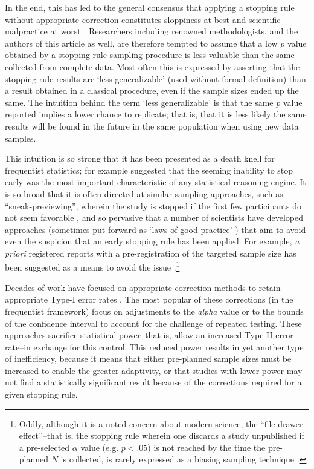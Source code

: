 \documentclass[man]{apa7}
\theoremstyle{definition}
\begin{document}
In the end, this has led to the general consensus that applying a stopping rule without appropriate correction constitutes sloppiness at best and scientific malpractice at worst \parencite{fanelli2009many}.  Researchers including renowned methodologists, and the authors of this article as well, are therefore tempted to assume that a low $p$ value obtained by a stopping rule sampling procedure is less valuable than the same collected from complete data.  Most often this is expressed by asserting that the stopping-rule %
results are `less generalizable' (used without formal definition) than a result obtained in a classical procedure, even if the sample sizes ended up the same.  The intuition behind the term `less generalizable' is that the same $p$ value reported implies a lower chance to replicate; that is, that it is less likely the same results will be found in the future in the same population when using new data samples. 

This intuition is so strong that it has been presented as a death knell for frequentist statistics; for example \textcite{Venderkerchove_2014} suggested that the seeming inability to stop early was the most important characteristic of any statistical reasoning engine.  It is so broad that it is often directed at similar sampling approaches, such as ``sneak-previewing'', wherein the study is stopped if the first few participants do not seem favorable \parencite[see, e.g.][]{armitage1969repeated}, and so pervasive that a number of scientists have developed approaches (sometimes put forward as `laws of good practice' \parencite{simmons2011false}) that aim to avoid even the suspicion that an early stopping rule has been applied. For example, \textit{a priori} registered reports with a pre-registration of the targeted sample size has been suggested as a means to avoid the issue \parencite{nosek2014registered}.\footnote{Oddly, although it is a noted concern about modern science, the ``file-drawer effect''--that is, the stopping rule wherein one discards a study unpublished if a pre-selected $\alpha$ value (e.g. $p < .05$) is not reached by the time the pre-planned $N$ is collected, is rarely expressed as a biasing sampling technique \parencite{rosenthal1979file}.}

Decades of work have focused on appropriate correction methods to retain appropriate Type-I error rates \parencite[see][for an overview]{shaffer1995multiple}. The most popular of these corrections (in the frequentist framework) focus on adjustments to the \textit{alpha} value or to the bounds of the confidence interval to account for the challenge of repeated testing\parencite[see, e.g.][]{pocock1977group, o1979multiple}.  These approaches sacrifice statistical power--that is, allow an increased Type-II error rate--in exchange for this control.  This reduced power results in yet another type of inefficiency, because it means that either pre-planned sample sizes must be increased to enable the greater adaptivity, or that studies with lower power may not find a statistically significant result because of the corrections required for a given stopping rule.
\end{document}
